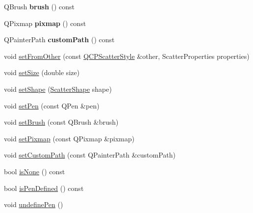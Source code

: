 \begin{DoxyCompactItemize}
\item 
Q\+Brush {\bfseries brush} () const \hypertarget{class_q_c_p_scatter_style_a46bf481d84bfa31b287dd43a3bf86d37}{}\label{class_q_c_p_scatter_style_a46bf481d84bfa31b287dd43a3bf86d37}

\item 
Q\+Pixmap {\bfseries pixmap} () const \hypertarget{class_q_c_p_scatter_style_a9bab44cc41fcd585621a4b3e0e48231b}{}\label{class_q_c_p_scatter_style_a9bab44cc41fcd585621a4b3e0e48231b}

\item 
Q\+Painter\+Path {\bfseries custom\+Path} () const \hypertarget{class_q_c_p_scatter_style_a4dd4998dfb0d6889205668a06c790328}{}\label{class_q_c_p_scatter_style_a4dd4998dfb0d6889205668a06c790328}

\item 
void \hyperlink{class_q_c_p_scatter_style_a7d59ba8864914f765817841089e436f1}{set\+From\+Other} (const \hyperlink{class_q_c_p_scatter_style}{Q\+C\+P\+Scatter\+Style} \&other, Scatter\+Properties properties)
\item 
void \hyperlink{class_q_c_p_scatter_style_aaefdd031052892c4136129db68596e0f}{set\+Size} (double size)
\item 
void \hyperlink{class_q_c_p_scatter_style_a7c641c4d4c6d29cb705d3887cfce91c1}{set\+Shape} (\hyperlink{class_q_c_p_scatter_style_adb31525af6b680e6f1b7472e43859349}{Scatter\+Shape} shape)
\item 
void \hyperlink{class_q_c_p_scatter_style_a761f1f229cc0ca4703e1e2b89f6dd1ba}{set\+Pen} (const Q\+Pen \&pen)
\item 
void \hyperlink{class_q_c_p_scatter_style_a74d692aaeb8d4b36d6f7d510e44264b1}{set\+Brush} (const Q\+Brush \&brush)
\item 
void \hyperlink{class_q_c_p_scatter_style_a5fb611d46acfac520d7b89a1c71d9246}{set\+Pixmap} (const Q\+Pixmap \&pixmap)
\item 
void \hyperlink{class_q_c_p_scatter_style_a96a3e949f90b2afe5677ca9412a12a1e}{set\+Custom\+Path} (const Q\+Painter\+Path \&custom\+Path)
\item 
bool \hyperlink{class_q_c_p_scatter_style_aa3861281108d0adbeb291c820ea3925c}{is\+None} () const 
\item 
bool \hyperlink{class_q_c_p_scatter_style_a7f1385a8d5e4f349a6b8030723fbd0f7}{is\+Pen\+Defined} () const 
\item 
void \hyperlink{class_q_c_p_scatter_style_acabc2a8c83d650b946f50c3166b6c35e}{undefine\+Pen} ()
\item 

\end{DoxyCompactItemize}
